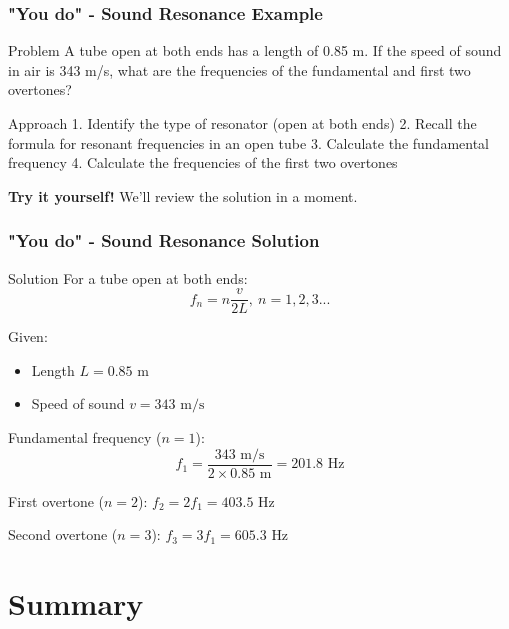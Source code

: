 \documentclass{beamer}
\begin{document}
\begin{frame}
\frametitle{"You do" - Sound Resonance Example}
\begin{block}{Problem}
A tube open at both ends has a length of 0.85 m. If the speed of sound in air is 343 m/s, what are the frequencies of the fundamental and first two overtones?
\end{block}

\begin{block}{Approach}
1. Identify the type of resonator (open at both ends)
2. Recall the formula for resonant frequencies in an open tube
3. Calculate the fundamental frequency
4. Calculate the frequencies of the first two overtones
\end{block}

\textbf{Try it yourself!} We'll review the solution in a moment.
\end{frame}

\begin{frame}
\frametitle{"You do" - Sound Resonance Solution}
\begin{block}{Solution}
For a tube open at both ends:
\begin{equation}
f_n = n\frac{v}{2L}, \: n = 1,2,3...
\end{equation}

Given:
\begin{itemize}
\item Length $L = 0.85 \text{ m}$
\item Speed of sound $v = 343 \text{ m/s}$
\end{itemize}

Fundamental frequency ($n = 1$):
\begin{equation}
f_1 = \frac{343 \text{ m/s}}{2 \times 0.85 \text{ m}} = 201.8 \text{ Hz}
\end{equation}

First overtone ($n = 2$): $f_2 = 2f_1 = 403.5 \text{ Hz}$

Second overtone ($n = 3$): $f_3 = 3f_1 = 605.3 \text{ Hz}$
\end{block}
\end{frame}

\section{Summary}
\end{document}
